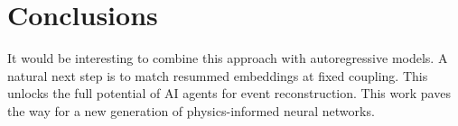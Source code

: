 \section{Conclusions}\label{sec:conclusions}

It would be interesting to combine this approach with autoregressive
models. A natural next step is to match resummed embeddings at fixed
coupling. This unlocks the full potential of AI agents for event
reconstruction. This work paves the way for a new generation of
physics-informed neural networks.

